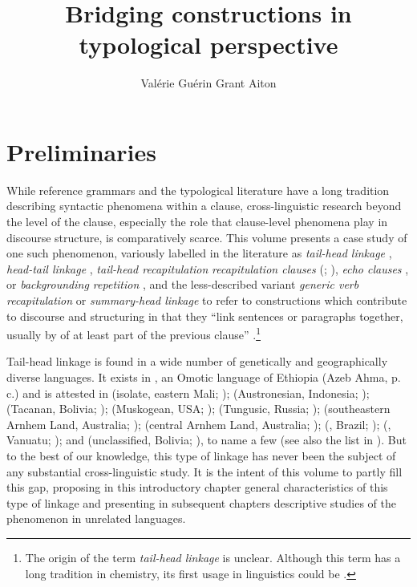 \documentclass[output=paper]{LSP/langsci}
\author{
   Valérie Guérin\affiliation{James Cook University}\lastand
  Grant Aiton\affiliation{James Cook University}
}
\title{Bridging constructions in typological perspective}
\begin{document}
\label{ch:1}
\section{Preliminaries}
\label{GuAi1prelim}

While reference grammars and the typological literature have a long tradition describing syntactic phenomena within a clause, cross-linguistic research beyond the level of the clause, especially the role that clause-level phenomena play in discourse structure, is comparatively scarce. This volume presents a case study of one such phenomenon, variously labelled in the literature as \textit{tail-head linkage} \citep{devries.2005}, \textit{head-tail linkage} \citep[][163]{fabian98}, \textit{tail-head recapitulation} \citep[][197]{farr99} \textit{recapitulation clauses} (\citealt[][438]{Genetti.2007}; \citealt[][17]{stirling93}), \textit{echo clauses} \citep{Heath18}, or \textit{backgrounding repetition} \citep[][10]{McKay.2008}, and the less-described variant \textit{generic verb recapitulation} \citep[][204, 337]{farr99} or \textit{summary-head linkage} \citep[][274]{Thompson.et.al.2007} to refer to constructions which contribute to discourse  and structuring in that they ``link sentences or paragraphs together, usually by  of at least part of the previous clause'' \citep[][342]{Thurman1975}.\footnote{The origin of the term \textit{tail-head linkage} is unclear. Although this term has a long tradition in chemistry, its first usage in linguistics could be \citet{Longacre.1968}.}  

Tail-head linkage is found in a wide number of genetically and geographically diverse languages. It exists in , an Omotic language of Ethiopia (Azeb Ahma, p. c.) and is attested in  (isolate, eastern Mali; \citealt{Heath18});  (Austronesian, Indonesia; \citealt{Plattel2013});  (Tacanan, Bolivia; \citealt{Guillaume2011});  (Muskogean, USA; \citealt{Martin1998});  (Tungusic, Russia; \citealt{Grenoble2012});  (southeastern Arnhem Land, Australia; \citealt{heath1985});  (central Arnhem Land, Australia; \citealt{McKay.2008});  (, Brazil; \citealt{aikhenvald19});  (, Vanuatu; \citealt{brotchie09}); and  (unclassified, Bolivia; \citealt{vangijn14}), to name a few (see also the list in \citealt[][111]{Guillaume2011}). But to the best of our knowledge, this type of linkage has never been the subject of any substantial cross-linguistic study. It is the intent of this volume to partly fill this gap, proposing in this introductory chapter general characteristics of this type of linkage and presenting in subsequent chapters descriptive studies of the phenomenon in unrelated languages.
\end{document}
